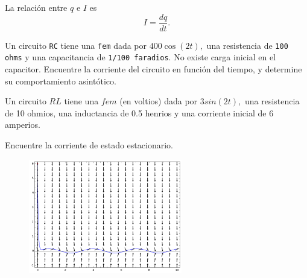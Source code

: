 	La relación entre $q$ e $I$ es
	\begin{equation}
		\label{bron:7.11}
		I=\dfrac{dq}{dt}.
	\end{equation}
	



{}
	\begin{problema}
		Un circuito \texttt{RC} tiene una \texttt{fem} dada por $400\cos(2t),$ una resistencia de \texttt{100 ohms} y una capacitancia de \texttt{1/100 faradios}. No existe carga inicial en el capacitor. Encuentre la corriente del circuito en función del tiempo, y determine su comportamiento asintótico.
	\end{problema}
	




	\begin{problema}
		Un circuito $RL$ tiene una $fem$ (en voltios) dada por $3sin(2t),$ una resistencia de 10 ohmios, una inductancia de 0.5 henrios y una corriente inicial de 6 amperios.
		
		Encuentre la corriente de estado estacionario.
	\end{problema}
	


	\begin{figure}
		\centering
		\includegraphics[height=5cm,keepaspectratio=true]{./edo/img020505.png}
		\label{fig:020505}
	\end{figure}
	











